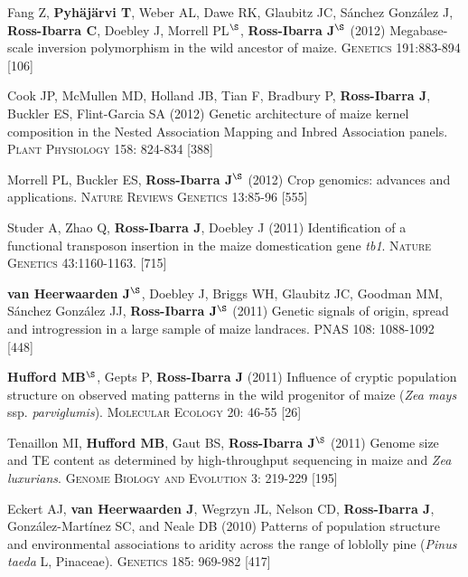 \documentclass[letterpaper,10pt]{article}
\begin{document}
\begin{etaremune}
\item Fang Z, {\bf Pyh\"aj\"arvi T}, Weber AL, Dawe RK, Glaubitz JC, S\'{a}nchez Gonz\'{a}lez J, {\bf Ross-Ibarra C}, Doebley J, Morrell PL$^\S$, {\bf Ross-Ibarra J}$^\S$  (2012) Megabase-scale inversion polymorphism in the wild ancestor of maize. \textsc{Genetics} 191:883-894
 [106]\\


\item Cook JP, McMullen MD, Holland JB, Tian F, Bradbury P, {\bf Ross-Ibarra J}, Buckler ES, Flint-Garcia SA (2012) Genetic architecture of maize kernel composition in the Nested Association Mapping and Inbred Association panels. \textsc{Plant Physiology} 158: 824-834
 [388]\\

\item Morrell PL, Buckler ES, {\bf Ross-Ibarra J}$^\S$ (2012) Crop genomics: advances and applications.  \textsc{Nature Reviews Genetics} 13:85-96 %
 [555]\\


\item Studer A, Zhao Q, {\bf Ross-Ibarra J}, Doebley J (2011) Identification of a functional transposon insertion in the maize domestication gene \emph{tb1}.  \textsc{Nature Genetics} 43:1160-1163.
 [715]\\


\item {\bf van Heerwaarden J}$^\S$, Doebley J, Briggs WH, Glaubitz JC, Goodman MM, S\'{a}nchez Gonz\'{a}lez JJ, {\bf Ross-Ibarra J}$^\S$ (2011) Genetic signals of origin, spread and introgression in a large sample of maize landraces. PNAS 108: 1088-1092
 [448]\\


\item {\bf Hufford MB}$^\S$, Gepts P, {\bf Ross-Ibarra J} (2011) Influence of cryptic population structure on observed mating patterns in the wild progenitor of maize (\emph{Zea mays} ssp. \emph{parviglumis}).  \textsc{Molecular Ecology} 20: 46-55
 [26]\\


\item Tenaillon MI, {\bf Hufford MB}, Gaut BS, {\bf Ross-Ibarra J}$^\S$ (2011)  Genome size and TE content as determined by high-throughput sequencing in maize and \emph{Zea luxurians}.  \textsc{Genome Biology and Evolution } 3: 219-229
 [195]\\


\item Eckert AJ, {\bf van Heerwaarden J}, Wegrzyn JL, Nelson CD, {\bf Ross-Ibarra J}, Gonz\'{a}lez-Mart\'{i}nez SC, and Neale DB (2010) Patterns of population structure and environmental associations to aridity across the range of loblolly pine (\emph{Pinus taeda} L, Pinaceae).  \textsc{Genetics} 185: 969-982
 [417]\\



\end{etaremune}
\end{document}
